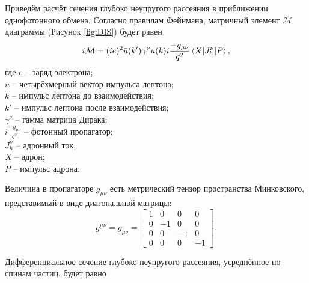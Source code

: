 \documentclass{extarticle}
\begin{document}
Приведём расчёт сечения глубоко неупругого рассеяния в приближении однофотонного обмена. Согласно правилам Фейнмана, матричный элемент $\mathcal{M}$ диаграммы (Рисунок \ref{fig:DIS}) будет равен
\begin{equation}
	i\mathcal{M} = (ie)^2 \bar{u}(k')\gamma^\nu u(k) i \frac{-g_{\mu\nu}}{q^2} \braket{X | J_h^\nu | P},
\end{equation}
где $e$ -- заряд электрона; \\ $u$ -- четырёхмерный вектор импульса лептона; \\ $k$ -- импульс лептона до взаимодействия; \\ $k'$ -- импульс лептона после взаимодействия; \\ $\gamma^\nu$ -- гамма матрица Дирака; \\ $i \frac{-g_{\mu\nu}}{q^2}$ -- фотонный пропагатор; \\ $ J_h^\nu $ -- адронный ток; \\ $X$ -- адрон; \\ $P$ -- импульс адрона. 

Величина в пропагаторе $g_{\mu\nu}$ есть метрический тензор пространства Минковского, представимый в виде диагональной матрицы:
\begin{equation}
	g^{\mu\nu} = g_{\mu\nu} = \begin{bmatrix} 1&0&0&0\\0&-1&0&0\\0&0&-1&0\\0&0&0&-1 \end{bmatrix}.
\end{equation}

Дифференциальное сечение глубоко неупругого рассеяния, усреднённое по спинам частиц, будет равно
\end{document}
